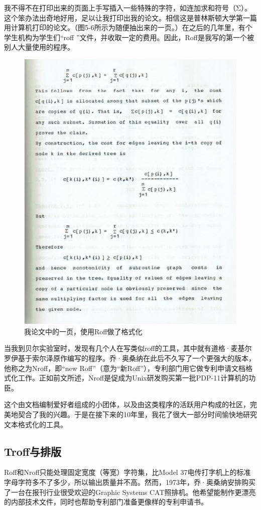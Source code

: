 \documentclass[a4paper,12pt,UTF8,twoside]{ctexbook}
\begin{document}
我不得不在打印出来的页面上手写插入一些特殊的字符，如连加求和符号（Σ）。这个笨办法出奇地好用，足以让我打印出我的论文。相信这是普林斯顿大学第一篇用计算机打印的论文。（图5-6所示为随便抽出来的一页。）在之后的几年里，有个学生机构为学生们“roff ”文件，并收取一定的费用。因此，Roff是我写的第一个被别人大量使用的程序。

\begin{figure}[htbp]
	\centering
	\includegraphics[width=0.7\linewidth]{45}
	\caption{我论文中的一页，使用Roff做了格式化}
	\label{fig:1}
\end{figure}

当我到贝尔实验室时，发现有几个人在写类似roff的工具，其中就有道格·麦基尔罗伊基于索尔泽原作编写的程序。乔·奥桑纳在此后不久写了一个更强大的版本，他称之为Nroff，即“new Roff”（意为“新Roff”），专利部门用它做专利申请文档格式化工作。正如前文所述，Nroff是促成为Unix研发购买第一批PDP-11计算机的功臣。

这个由文档编制爱好者组成的小团体，以及由这类程序的活跃用户构成的社区，完美地契合了我的兴趣。于是在接下来的10年里，我花了很大一部分时间愉快地研究文本格式化的工具。

\subsection{Troff与排版}

Roff和Nroff只能处理固定宽度（等宽）字符集，比Model 37电传打字机上的标准字母字符多不了多少，所以输出质量并不高。然而，1973年，乔·奥桑纳安排购买了一台在报刊行业很受欢迎的Graphic Systems CAT照排机。他希望能制作更漂亮的内部技术文件，同时也帮助专利部门准备更像样的专利申请书。
\end{document}
